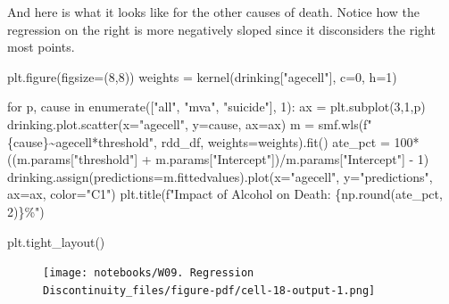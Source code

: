 \documentclass[
  letterpaper,
  DIV=11,
  numbers=noendperiod]{scrreprt}
\newenvironment{Shaded}{\begin{snugshade}}{\end{snugshade}}
\newcommand{\BuiltInTok}[1]{\textcolor[rgb]{0.00,0.23,0.31}{#1}}
\newcommand{\ControlFlowTok}[1]{\textcolor[rgb]{0.00,0.23,0.31}{#1}}
\newcommand{\DecValTok}[1]{\textcolor[rgb]{0.68,0.00,0.00}{#1}}
\newcommand{\KeywordTok}[1]{\textcolor[rgb]{0.00,0.23,0.31}{#1}}
\newcommand{\NormalTok}[1]{\textcolor[rgb]{0.00,0.23,0.31}{#1}}
\newcommand{\OperatorTok}[1]{\textcolor[rgb]{0.37,0.37,0.37}{#1}}
\newcommand{\SpecialCharTok}[1]{\textcolor[rgb]{0.37,0.37,0.37}{#1}}
\newcommand{\SpecialStringTok}[1]{\textcolor[rgb]{0.13,0.47,0.30}{#1}}
\newcommand{\StringTok}[1]{\textcolor[rgb]{0.13,0.47,0.30}{#1}}
\begin{document}
And here is what it looks like for the other causes of death. Notice how
the regression on the right is more negatively sloped since it
disconsiders the right most points.

\begin{Shaded}
\begin{Highlighting}[]
\NormalTok{plt.figure(figsize}\OperatorTok{=}\NormalTok{(}\DecValTok{8}\NormalTok{,}\DecValTok{8}\NormalTok{))}
\NormalTok{weights }\OperatorTok{=}\NormalTok{ kernel(drinking[}\StringTok{"agecell"}\NormalTok{], c}\OperatorTok{=}\DecValTok{0}\NormalTok{, h}\OperatorTok{=}\DecValTok{1}\NormalTok{)}

\ControlFlowTok{for}\NormalTok{ p, cause }\KeywordTok{in} \BuiltInTok{enumerate}\NormalTok{([}\StringTok{"all"}\NormalTok{, }\StringTok{"mva"}\NormalTok{, }\StringTok{"suicide"}\NormalTok{], }\DecValTok{1}\NormalTok{):}
\NormalTok{    ax }\OperatorTok{=}\NormalTok{ plt.subplot(}\DecValTok{3}\NormalTok{,}\DecValTok{1}\NormalTok{,p)}
\NormalTok{    drinking.plot.scatter(x}\OperatorTok{=}\StringTok{"agecell"}\NormalTok{, y}\OperatorTok{=}\NormalTok{cause, ax}\OperatorTok{=}\NormalTok{ax)}
\NormalTok{    m }\OperatorTok{=}\NormalTok{ smf.wls(}\SpecialStringTok{f"}\SpecialCharTok{\{}\NormalTok{cause}\SpecialCharTok{\}}\SpecialStringTok{\textasciitilde{}agecell*threshold"}\NormalTok{, rdd\_df, weights}\OperatorTok{=}\NormalTok{weights).fit()}
\NormalTok{    ate\_pct }\OperatorTok{=} \DecValTok{100}\OperatorTok{*}\NormalTok{((m.params[}\StringTok{"threshold"}\NormalTok{] }\OperatorTok{+}\NormalTok{ m.params[}\StringTok{"Intercept"}\NormalTok{])}\OperatorTok{/}\NormalTok{m.params[}\StringTok{"Intercept"}\NormalTok{] }\OperatorTok{{-}} \DecValTok{1}\NormalTok{)}
\NormalTok{    drinking.assign(predictions}\OperatorTok{=}\NormalTok{m.fittedvalues).plot(x}\OperatorTok{=}\StringTok{"agecell"}\NormalTok{, y}\OperatorTok{=}\StringTok{"predictions"}\NormalTok{, ax}\OperatorTok{=}\NormalTok{ax, color}\OperatorTok{=}\StringTok{"C1"}\NormalTok{)}
\NormalTok{    plt.title(}\SpecialStringTok{f"Impact of Alcohol on Death: }\SpecialCharTok{\{}\NormalTok{np}\SpecialCharTok{.}\BuiltInTok{round}\NormalTok{(ate\_pct, }\DecValTok{2}\NormalTok{)}\SpecialCharTok{\}}\SpecialStringTok{\%"}\NormalTok{)}

\NormalTok{plt.tight\_layout()}
\end{Highlighting}
\end{Shaded}

\begin{figure}[H]

{\centering \texttt{[image: notebooks/W09. Regression Discontinuity\_files/figure-pdf/cell-18-output-1.png]}

}

\end{figure}
\end{document}
